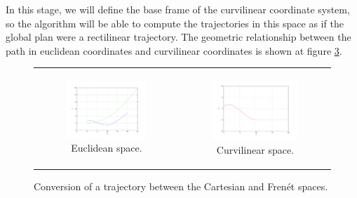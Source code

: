 In this stage, we will define the base frame of the curvilinear coordinate system, so the algorithm will be able to compute the trajectories in this space as if the global plan were a rectilinear trajectory. The geometric relationship between the path in euclidean coordinates and curvilinear coordinates is shown at figure \ref{fig:cp07_euclidean_frenet_conversion}.

\begin{figure}[h!]
\begin{tabular}{cc}
  \begin{subfigure}[b]{0.5\textwidth}
      \centering
      \includegraphics[width=\textwidth, trim=50 40 80 60,clip]{justOneCartesian45}
      \caption{Euclidean space.}
      \label{fig:cp07_justOneCartesian45}
  \end{subfigure} &
  \begin{subfigure}[b]{0.5\textwidth}
    \centering
    \includegraphics[width=\textwidth, trim=50 40 80 60,clip]{justOneFrenet45}
    \caption{Curvilinear space.}
    \label{fig:cp07_justOneFrenet45}
  \end{subfigure}%
\end{tabular}
\caption{Conversion of a trajectory between the Cartesian and Frenét spaces. }\label{fig:cp07_euclidean_frenet_conversion}
\end{figure}


